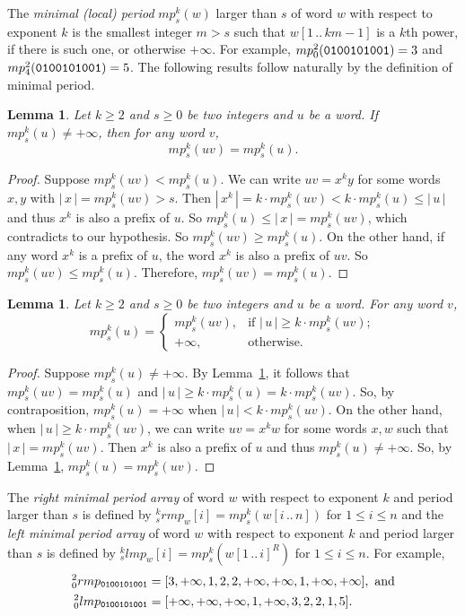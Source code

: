\documentclass{article}
\def\subw#1#2#3{{#1[#2\,..\,#3]}}
\def\abs#1{{|\,#1\,|}}
\newtheorem{lemma}[theorem]{Lemma}
\begin{document}
The \emph{minimal (local) period} $mp_s^k(w)$ larger than $s$ of
word $w$ with respect to exponent $k$ is the smallest integer $m>s$
such that $\subw{w}{1}{km-1}$ is a $k$th power, if there is such
one, or otherwise $+\infty$. For example,
$mp^2_0({\tt0100101001})=3$ and $mp^2_4({\tt0100101001})=5$. The
following results follow naturally by the definition of minimal
period.


\begin{lemma}\label{lemma:mpexpd}
Let $k\geq2$ and $s\geq0$ be two integers and $u$ be a word. If
$mp_s^k(u)\neq+\infty$, then for any word $v$,
  \[mp_s^k(uv)=mp_s^k(u).\]
\end{lemma}
\begin{proof}
Suppose $mp_s^k(uv)<mp_s^k(u)$. We can write $uv=x^ky$ for some
words $x,y$ with $\abs{x}=mp_s^k(uv)>s$. Then $\abs{x^k}=k\cdot
mp_s^k(uv)<k\cdot mp_s^k(u)\leq\abs{u}$ and thus $x^k$ is also a
prefix of $u$. So $mp_s^k(u)\leq\abs{x}=mp_s^k(uv)$, which
contradicts to our hypothesis. So $mp_s^k(uv)\geq mp_s^k(u)$. On the
other hand, if any word $x^k$ is a prefix of $u$, the word $x^k$ is
also a prefix of $uv$. So $mp_s^k(uv)\leq mp_s^k(u)$. Therefore,
$mp_s^k(uv)=mp_s^k(u)$.
\end{proof}


\begin{lemma}\label{lemma:mpshrk}
Let $k\geq2$ and $s\geq0$ be two integers and $u$ be a word. For any
word $v$,
  \[mp_s^k(u)=\begin{cases}mp_s^k(uv),&\textrm{if }\abs{u}\geq k\cdot mp_s^k(uv);\\
  +\infty, &\textrm{otherwise}. \end{cases}\]
\end{lemma}
\begin{proof}
Suppose $mp_s^k(u)\neq+\infty$. By Lemma~\ref{lemma:mpexpd}, it
follows that $mp_s^k(uv)=mp_s^k(u)$ and $\abs{u}\geq k\cdot
mp_s^k(u)=k\cdot mp_s^k(uv)$. So, by contraposition,
$mp_s^k(u)=+\infty$ when $\abs{u}<k\cdot mp_s^k(uv)$. On the other
hand, when $\abs{u}\geq k\cdot mp_s^k(uv)$, we can write $uv=x^kw$
for some words $x,w$ such that $\abs{x}=mp_s^k(uv)$. Then $x^k$ is
also a prefix of $u$ and thus $mp_s^k(u)\neq+\infty$. So, by
Lemma~\ref{lemma:mpexpd}, $mp_s^k(u)=mp_s^k(uv)$.
\end{proof}





The \emph{right minimal period array} of word $w$ with respect to
exponent $k$ and period larger than $s$ is defined by
${}_s^krmp_w[i]=mp_s^k(\subw{w}{i}{n})$ for $1\leq i\leq n$ and the
\emph{left minimal period array} of word $w$ with respect to
exponent $k$ and period larger than $s$ is defined by
${}_s^klmp_w[i]=mp_s^k(\subw{w}{1}{i}^R)$ for $1\leq i\leq n$. For
example,
\begin{align*}
  {}_0^2rmp_{\tt0100101001}&=[3,+\infty,1,2,2,+\infty,+\infty,1,+\infty,+\infty],\textrm{ and} \\
  {}_0^2lmp_{\tt0100101001}&=[+\infty,+\infty,+\infty,1,+\infty,3,2,2,1,5].
\end{align*}
\end{document}
